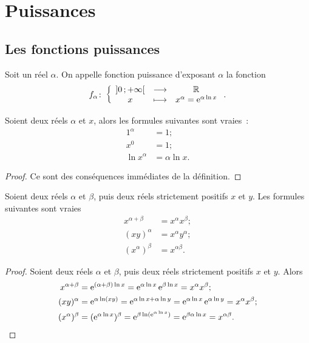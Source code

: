 \section{Puissances}
\label{sec:chap1-puissances}
\subsection{Les fonctions puissances}
\label{subsec:chap1-fonctionspuissances}
\begin{defdef}
    Soit un réel \(\alpha\). On appelle fonction puissance d'exposant 
    \(\alpha\) la fonction
    \begin{equation}
        f_{\alpha}\colon \left\{\begin{array}{ccc} \left] 0 \, ;  +\infty \right[ & \longrightarrow &\mathbb{R}\\ x & \longmapsto & x^{\alpha}=\operatorname{e}^{\alpha \ln 
        x} \end{array} \right..
    \end{equation}
\end{defdef}
\begin{prop}
    Soient deux réels \(\alpha\) et \(x\), alors les formules suivantes sont 
    vraies~:
    \begin{align}
        1^{\alpha}&=1; \\
        x^0&=1; \\
        \ln x^{\alpha} &= \alpha \ln x.
    \end{align}
\end{prop}
\begin{proof}
    Ce sont des conséquences immédiates de la définition.
\end{proof}
\begin{prop}
    Soient deux réels \(\alpha\) et \(\beta\), puis deux réels strictement 
    positifs \(x\) et \(y\). Les formules suivantes sont vraies
    \begin{align}
        x^{\alpha+\beta} &= x^\alpha x^\beta;\\
        (xy)^\alpha &= x^\alpha y^\alpha;\\
        (x^\alpha)^\beta &= x^{\alpha\beta}.
    \end{align}
\end{prop}
\begin{proof}
    Soient deux réels \(\alpha\) et \(\beta\), puis deux réels strictement 
    positifs \(x\) et \(y\). Alors
    \begin{align}
        x^{\alpha+\beta} &=\operatorname{e}^{(\alpha+\beta)\ln x}=\operatorname{e}^{\alpha \ln x} 
        \operatorname{e}^{\beta \ln x}=x^\alpha x^\beta;\\
        (xy)^\alpha &=\operatorname{e}^{\alpha \ln (xy)}=\operatorname{e}^{\alpha \ln x +\alpha \ln 
        y}=\operatorname{e}^{\alpha \ln x} \operatorname{e}^{\alpha \ln y}=x^\alpha x^\beta ;\\
            (x^\alpha)^\beta &=(\operatorname{e}^{\alpha \ln x})^\beta=\operatorname{e}^{\beta 
            \ln(\operatorname{e}^{\alpha \ln x})}=\operatorname{e}^{\beta \alpha \ln x}=x^{\alpha 
        \beta}.
    \end{align}
\end{proof}
